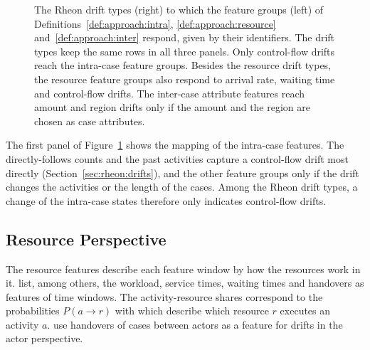 \begin{figure}[tb]
	\caption[Feature groups and the drift types they respond to]{%
		The Rheon drift types (right) to which the feature groups (left) of Definitions~\ref{def:approach:intra}, \ref{def:approach:resource} and~\ref{def:approach:inter} respond, given by their identifiers. The drift types keep the same rows in all three panels.
		Only control-flow drifts reach the intra-case feature groups.
		Besides the resource drift types, the resource feature groups also respond to arrival rate, waiting time and control-flow drifts.
		The inter-case attribute features reach amount and region drifts only if the amount and the region are chosen as case attributes.}
	\label{fig:approach:features}
\end{figure}

The first panel of Figure~\ref{fig:approach:features} shows the mapping of the intra-case features. The directly-follows counts and the past activities capture a control-flow drift most directly (Section~\ref{sec:rheon:drifts}), and the other feature groups only if the drift changes the activities or the length of the cases. Among the Rheon drift types, a change of the intra-case states therefore only indicates control-flow drifts.

\subsection{Resource Perspective}
\label{sec:approach:features:resource}
The resource features describe each feature window by how the resources work in it. \textcite{adams2023explainable} list, among others, the workload, service times, waiting times and handovers as features of time windows. The activity-resource shares correspond to the probabilities $P(a \to r)$ with which \textcite{khraiwesh2027window} describe which resource $r$ executes an activity $a$. \textcite{klijn2024multi} use handovers of cases between actors as a feature for drifts in the actor perspective.

